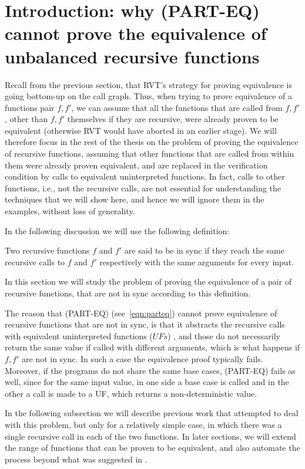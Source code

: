 \newcommand\os[1]{\textcolor{blue}{[os: #1]}}
\newcommand\crjs[1]{\textcolor{purple}{[CRJS: #1]}}
\section{Introduction: why (PART-EQ) cannot prove the equivalence of unbalanced recursive functions}
Recall from the previous section, that RVT's strategy for proving equivalence is going bottom-up on the call graph. Thus, when trying to prove equivalence of a functions pair $f,f'$, we can assume that all the functions that are called from $f,f'$, other than $f,f'$ themselves if they are recursive, were already proven to be equivalent (otherwise RVT would have aborted in an earlier stage). We will therefore focus in the rest of the thesis on the problem of proving the equivalence of recursive functions, assuming that other functions that are called from within them were already proven equivalent, and are replaced in the verification condition by calls to equivalent uninterpreted functions. In fact, calls to other functions, i.e., not the recursive calls, are not essential for understanding the techniques that we will show here, and hence we will ignore them in the examples, without loss of generality. 

In the following discussion we will use the following definition:
\begin{definition}[Sync]
Two recursive functions $f$ and $f'$ are said to be in sync if they reach the same recursive calls to $f$ and $f'$ respectively with the same arguments for every input.
\end{definition}
In this section we will study the problem of proving the equivalence of a pair of recursive functions, that are not in sync according to this definition. 


The reason that (PART-EQ) (see~\ref{eqn:parteq}) cannot prove equivalence of recursive functions that are not in sync, is that it abstracts the recursive calls with equivalent uninterpreted functions ($UFs$) \cite{DBLP:conf/dac/GodlinS09}, and those do not necessarily return the same value if called with different arguments, which is what happens if $f,f'$ are not in sync. In such a case the equivalence proof typically fails.
Moreover, if the programs do not share the same base cases, (PART-EQ) fails as well, since for the same input value, in one side a base case is called and in the other a call is made to a UF, which returns a non-deterministic value.

In the following subsection we will describe previous work\cite{DBLP:conf/fm/StrichmanV16} that attempted to deal with this problem, but only for a relatively simple case, in which there was a single recursive call in each of the two functions. In later sections, we will extend the range of functions that can be proven to be equivalent, and also automate the process beyond what was suggested in \cite{DBLP:conf/fm/StrichmanV16}.

